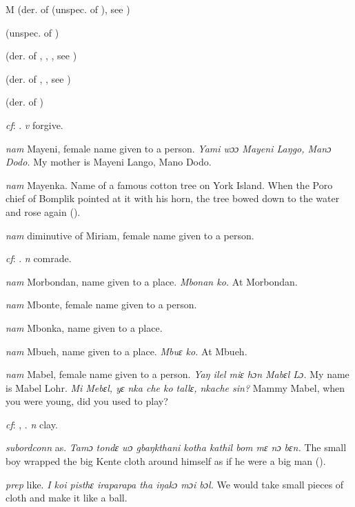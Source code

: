 \begin{letter}{M}
 (der. of  (unspec. of ), see ) 

 (unspec. of )

 (der. of , , , see ) 

 (der. of , , see ) 

 (der. of ) 

 \textit{cf}: . \textit{v} forgive.

 \textit{nam} Mayeni, female name given to a person. \textit{Yami wɔɔ Mayeni Laŋgo, Manɔ Dodo.} My mother is Mayeni Lango, Mano Dodo.

 \textit{nam} Mayenka. Name of a famous cotton tree on York Island. When the Poro chief of Bomplik pointed at it with his horn, the tree bowed down to the water and rose again (\citealt{Pichl1967}).

 \textit{nam} diminutive of Miriam, female name given to a person.

 \textit{cf}: . \textit{n} comrade.

 \textit{nam} Morbondan, name given to a place. \textit{Mbonan ko.} At Morbondan.

 \textit{nam} Mbonte, female name given to a person.

 \textit{nam} Mbonka, name given to a place. 

 \textit{nam} Mbueh, name given to a place. \textit{Mbuɛ ko.} At Mbueh.

 \textit{nam} Mabel, female name given to a person. \textit{Yaŋ ilel miɛ hɔn Mabɛl Lɔ.} My name is Mabel Lohr. \textit{Mi Mebɛl, yɛ nka che ko tallɛ, nkache sin?} Mammy Mabel, when you were young, did you used to play?

 \textit{cf}: , . \textit{n} clay.

 \textit{subordconn} as. \textit{Tamɔ tondɛ wɔ gbaŋkthani kotha kathil bom mɛ nɔ bɛn.} The small boy wrapped the big Kente cloth around himself as if he were a big man (\citealt{Pichl1967}).

 \textit{prep} like. \textit{I koi pisthɛ iraparapa tha iŋakɔ mɔi bɔl.} We would take small pieces of cloth and make it like a ball.


\end{letter}
